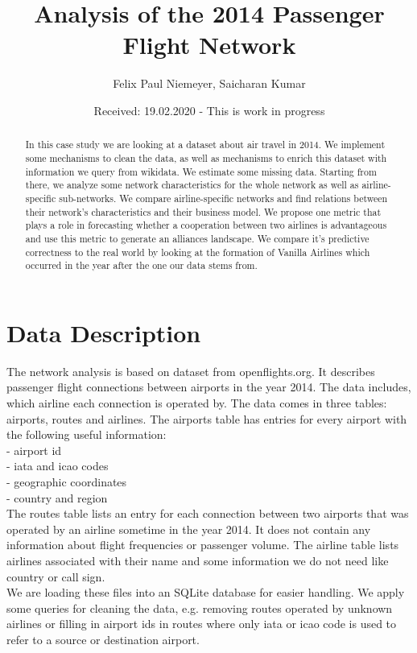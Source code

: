 \documentclass[twocolumn]{tum-article}
\title{Analysis of the 2014 Passenger Flight Network}
\author{Felix Paul Niemeyer\authormark{1},
	Saicharan Kumar\authormark{2}}
\affil[1]{felix.niemeyer@tum.de, MiM}
\affil[2]{saicharan.kumar@tum.de, MiM}
\date{Received: 19.02.2020 - This is work in progress}
\begin{document}
\maketitle

\begin{abstract}
In this case study we are looking at a dataset about air travel in 2014. 
We implement some mechanisms to clean the data, as well as mechanisms to enrich this dataset with information we query from wikidata.
We estimate some missing data.
Starting from there, we analyze some network characteristics for the whole network as well as airline-specific sub-networks.
We compare airline-specific networks and find relations between their network's characteristics and their business model.
We propose one metric that plays a role in forecasting whether a cooperation between two airlines is advantageous and use this metric to generate an alliances landscape.
We compare it's predictive correctness to the real world by looking at the formation of Vanilla Airlines which occurred in the year after the one our data stems from.
\end{abstract}

\section{Data Description}
The network analysis is based on dataset from openflights.org. 
It describes passenger flight connections between airports in the year 2014. 
The data includes, which airline each connection is operated by.
The data comes in three tables: airports, routes and airlines. 
The airports table has entries for every airport with the following useful information: \\
- airport id\\
- iata and icao codes\\
- geographic coordinates\\
- country and region\\

The routes table lists an entry for each connection between two airports that was operated by an airline sometime in the year 2014. It does not contain any information about flight frequencies or passenger volume. The airline table lists airlines associated with their name and some information we do not need like country or call sign. \\

We are loading these files into an SQLite database for easier handling. 
We apply some queries for cleaning the data, e.g. removing routes operated by unknown airlines or filling in airport ids in routes where only iata or icao code is used to refer to a source or destination airport. \\
\end{document}

